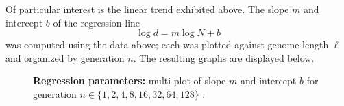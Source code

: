   Of particular interest is the linear trend exhibited above.  The
  slope $m$ and intercept $b$ of the regression line
  \begin{equation} \label{regresion}
  \log d = m \log N + b
  \end{equation}
was computed using the data above; each was plotted against genome
length $\ell$ and organized by generation $n$. The resulting
graphs are displayed below.

\begin{figure}[H]
\begin{center}
\hspace{5pt}
\caption{\textbf{Regression parameters:} multi-plot of slope $m$ and intercept $b$ for generation  $n \in \{1,  2,  4,  8,  16,  32,  64,  128\}$ .}
\label{regression-parameters}
\end{center}
\end{figure}

